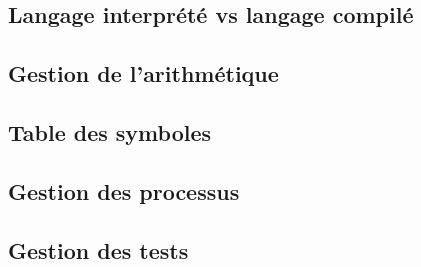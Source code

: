\subsection{Langage interprété vs langage compilé}
\subsection{Gestion de l'arithmétique}
\subsection{Table des symboles}
\subsection{Gestion des processus}
\subsection{Gestion des tests}
